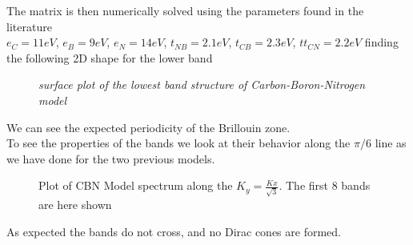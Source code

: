 \documentclass[a4paper]{article}
\begin{document}
The matrix is then numerically solved using the parameters found in the literature\\
$e_{C}=11eV$, $e_{B}=9eV$, $e_{N}=14eV$, $t_{NB}=2.1eV$, $t_{CB}=2.3eV$, $tt_{CN}=2.2eV$
 finding the following 2D shape for the lower band

\begin{figure}[h]
\centering
\caption{\label{3dcbn} \it surface plot of the lowest band structure of Carbon-Boron-Nitrogen model}
\end{figure}

We can see the expected periodicity of the Brillouin zone.\\ 
To see the properties of the bands we look at their behavior along the $\pi/6$ line as we have done for the two previous models.

\begin{figure}[h!]
\centering
\caption{\label{ebands_cbn}Plot of CBN Model spectrum along the $K_{y}=\frac{K{x}}{\sqrt{3}}$. The first 8 bands are here shown}
\end{figure}

As expected the bands do not cross, and no Dirac cones are formed.



%
%
\end{document}

